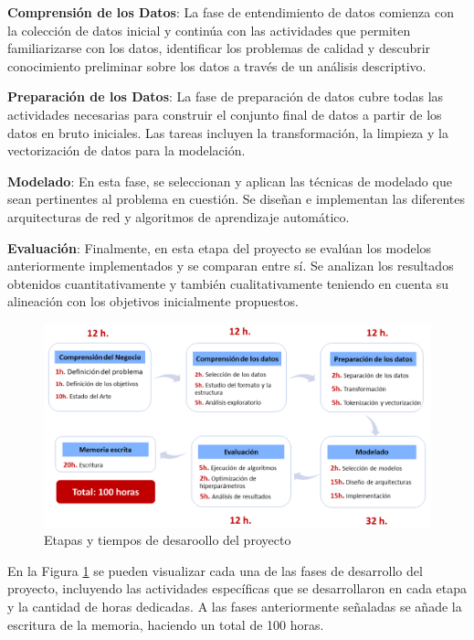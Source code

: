 \textbf{Comprensión de los Datos}: La fase de entendimiento de datos comienza con la colección de datos inicial y continúa con las actividades que permiten familiarizarse con los datos, identificar los problemas de calidad y descubrir conocimiento preliminar sobre los datos a través de un análisis descriptivo.

\textbf{Preparación de los Datos}: La fase de preparación de datos cubre todas las actividades necesarias para construir el conjunto final de datos a partir de los datos en bruto iniciales. Las tareas incluyen la transformación, la limpieza y la vectorización de datos para la modelación.

\textbf{Modelado}: En esta fase, se seleccionan y aplican las técnicas de modelado que sean pertinentes al problema en cuestión. Se diseñan e implementan las diferentes arquitecturas de red y algoritmos de aprendizaje automático.

\textbf{Evaluación}: Finalmente, en esta etapa del proyecto se evalúan los modelos anteriormente implementados y se comparan entre sí. Se analizan los resultados obtenidos cuantitativamente y también cualitativamente teniendo en cuenta su alineación con los objetivos inicialmente propuestos.

\begin{figure}[!tb]
  \begin{center}
    \includegraphics[angle=0, width=1\textwidth]{Graphics/crisp.png}
  \end{center}
    \caption{Etapas y tiempos de desaroollo del proyecto}\label{crisp}
\end{figure}

En la Figura \ref{crisp} se pueden visualizar cada una de las fases de desarrollo del proyecto, incluyendo las actividades específicas que se desarrollaron en cada etapa y la cantidad de horas dedicadas. A las fases anteriormente señaladas se añade la escritura de la memoria, haciendo un total de 100 horas.

